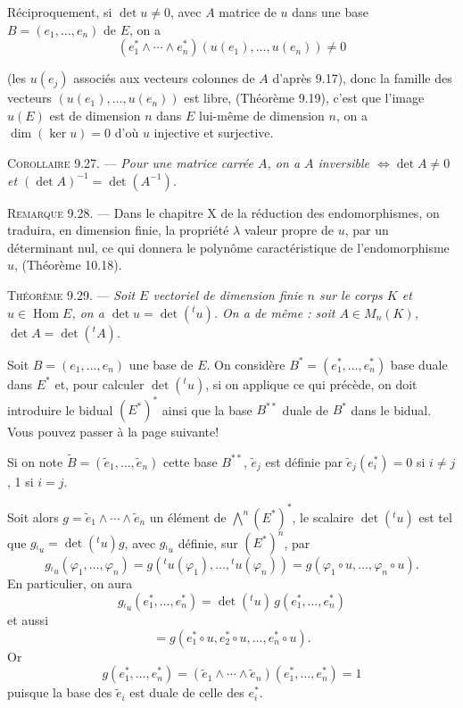 Réciproquement, si $\det u\ne0$, avec $A$ matrice de $u$ dans une base $B=(e_1,\ldots,e_n)$ de $E$, on a
\[
(e_1^*\wedge\cdots\wedge e_n^*)(u(e_1),\ldots,u(e_n))\ne0
\]
\begin{sloppypar}
(les $u(e_j)$ associés aux vecteurs colonnes de $A$ d'après 9.17), donc la famille des vecteurs $(u(e_1),\ldots,u(e_n))$ est libre, (Théorème 9.19), c'est que l'image $u(E)$ est de dimension $n$ dans $E$ lui-même de dimension $n$, on a $\dim(\ker u)=0$ d'où $u$ injective et surjective. \bookend
\end{sloppypar}

\medskip\noindent\textsc{Corollaire 9.27.} --- \emph{Pour une matrice carrée $A$, on a $A$ inversible $\Longleftrightarrow\det A\ne0$ et $(\det A)^{-1}=\det(A^{-1})$.}

\medskip\noindent\textsc{Remarque 9.28.} --- Dans le chapitre X de la réduction des endomorphismes, on traduira, en dimension finie, la propriété $\lambda$ valeur propre de $u$, par un déterminant nul, ce qui donnera le polynôme caractéristique de l'endomorphisme $u$, (Théorème 10.18).

\medskip\noindent\textsc{Théorème 9.29.} --- \emph{Soit $E$ vectoriel de dimension finie $n$ sur le corps $K$ et $u\in\operatorname{Hom}E$, on a $\det u=\det({}^tu)$. On a de même : soit $A\in M_n(K)$, $\det A=\det({}^tA)$.}

Soit $B=(e_1,\ldots,e_n)$ une base de $E$. On considère $B^*=(e_1^*,\ldots,e_n^*)$ base duale dans $E^*$ et, pour calculer $\det({}^tu)$, si on applique ce qui précède, on doit introduire le bidual $(E^*)^*$ ainsi que la base $B^{**}$ duale de $B^*$ dans le bidual. Vous pouvez passer à la page suivante!

Si on note $\widetilde B=(\widetilde e_1,\ldots,\widetilde e_n)$ cette base $B^{**}$, $\widetilde e_j$ est définie par $\widetilde e_j(e_i^*)=0$ si $i\ne j$, 1 si $i=j$.

Soit alors $g=\widetilde e_1\wedge\cdots\wedge\widetilde e_n$ un élément de $\bigwedge^n(E^*)^*$, le scalaire $\det({}^tu)$ est tel que $g_{{}^tu}=\det({}^tu)g$, avec $g_{{}^tu}$ définie, sur $(E^*)^n$, par
\[
g_{{}^tu}(\varphi_1,\ldots,\varphi_n)=g({}^tu(\varphi_1),\ldots,{}^tu(\varphi_n))
=g(\varphi_1\circ u,\ldots,\varphi_n\circ u).
\]
En particulier, on aura
\[
g_{{}^tu}(e_1^*,\ldots,e_n^*)=\det({}^tu)\,g(e_1^*,\ldots,e_n^*)
\]
et aussi
\[
=g(e_1^*\circ u,e_2^*\circ u,\ldots,e_n^*\circ u).
\]
Or
\[
g(e_1^*,\ldots,e_n^*)=(\widetilde e_1\wedge\cdots\wedge\widetilde e_n)(e_1^*,\ldots,e_n^*)=1
\]
puisque la base des $\widetilde e_i$ est duale de celle des $e_i^*$.

